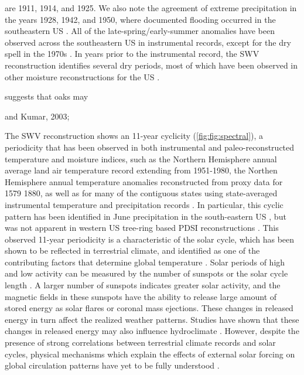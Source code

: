 are 1911, 1914, and 1925. We also note the agreement of extreme
precipitation in the years 1928, 1942, and 1950, where documented
flooding occurred in the southeastern US \cite{FIXME}. All of the
late-spring/early-summer anomalies have been observed across the
southeastern US in instrumental records, except for the dry spell
in the 1970s \cite{edwards1997characteristics}. In years prior to
the instrumental record, the SWV reconstruction identifies several
dry periods, most of which have been observed in other moisture
reconstructions for the US \cite{FIXME}.


 suggests that oaks may

and Kumar, 2003; %

The SWV reconstruction shows an 11-year cyclicity
(\ref{fig:fig:spectral}), a periodicity that has been observed in both
instrumental and paleo-reconstructed temperature and moisture indices,
such as the Northern Hemisphere annual average land air temperature
record extending from 1951-1980, the Northen Hemisphere annual temperature
anomalies reconstructed from proxy data for 1579 1880, as well as for many
of the contiguous states using state-averaged instrumental temperature and
precipitation records \cite{hancock1979cross, lassen1995variability}. In
particular, this cyclic pattern has been identified in June precipitation
in the south-eastern US \cite{hancock1979cross}, but was not apparent in
western US tree-ring based PDSI reconstructions \cite{cook1997new}. This
observed 11-year periodicity is a characteristic of the solar cycle, which
has been shown to be reflected in terrestrial climate, and identified
as one of the contributing factors that determine global temperature
\cite{reid2002solar, national1994Solar, lassen1995variability}. Solar
periods of high and low activity can be measured by the number of sunspots
or the solar cycle length \cite{friis1991length, usoskin2003millennium}. A
larger number of sunspots indicates greater solar activity, and the
magnetic fields in these sunspots have the ability to release large amount
of stored energy as solar flares or coronal mass ejections. These changes
in released energy in turn affect the realized weather patterns.  Studies
have shown that these changes in released energy may also influence
hydroclimate \cite{nichols2012hydroclimate, hancock1979cross}. However,
despite the presence of strong correlations between terrestrial climate
records and solar cycles, physical mechanisms which explain the effects
of external solar forcing on global circulation patterns have yet to be
fully understood \cite{franks2002assessing}.

